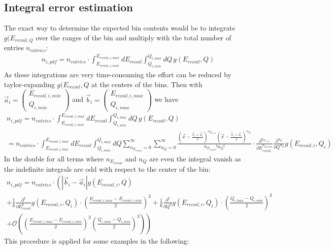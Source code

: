 \subsection{Integral error estimation}
The exact way to determine the expected bin contents would be to integrate $g(E_{recoil,Q}$ over the ranges of the bin and multiply with the total number of entries $n_{entries}$:
\begin{gather}
n_{i,pdf} = n_{entries} \cdot \int_{E_{recoil,i,min}}^{E_{recoil,i,max}} dE_{recoil} \int_{Q_{i,min}}^{Q_{i,max}} dQ \, g(E_{recoil},Q)
\end{gather}
As these integrations are very time-consuming the effort can be reduced by taylor-expanding $g(E_{recoil},Q$ at the centers of the bins.
Then with $\vec{a}_i = \begin{pmatrix} E_{recoil,i,min} \\ Q_{i,min} \end{pmatrix}$ and $\vec{b}_i = \begin{pmatrix} E_{recoil,i,max} \\ Q_{i,max} \end{pmatrix}$ we have
\begin{gather}
n_{i,pdf} = n_{entries} \cdot \int_{E_{recoil,i,min}}^{E_{recoil,i,max}} dE_{recoil} \int_{Q_{i,min}}^{Q_{i,max}} dQ \, g(E_{recoil},Q) \\
 = n_{entries} \cdot \int_{E_{recoil,i,min}}^{E_{recoil,i,max}} dE_{recoil} \int_{Q_{i,min}}^{Q_{i,max}} dQ \sum_{n_{E_{recoil}} = 0}^\infty \sum_{n_{Q} = 0}^\infty
\frac{\left( \vec{x} - \frac{\vec{b}_i + \vec{a}_i}{2} \right)^{n_{E_{recoil}}} \left( \vec{x} - \frac{\vec{b}_i + \vec{a}_i}{2} \right)^{n_{Q}}}{n_{E_{recoil}}! n_Q!}
\cdot \frac{\partial^{n_{E_{recoil}}}}{\partial E_{recoil} ^{n_{E_recoil}}} \frac{\partial^{n_{Q}}}{\partial Q^{n_{Q}}} g(E_{recoil,i},Q_i)
\end{gather}
In the double for all terms where $n_{E_{recoil}}$ and $n_{Q}$ are even the integral vanish as the indefinite integrals are odd with respect to the center of the bin:
\begin{gather}
n_{i,pdf} = n_{entries} \cdot \left(  \left| \vec{b}_i - \vec{a}_i \right| g(E_{recoil,i},Q) \right. \\
+ \frac{1}{6} \frac{\partial^2}{\partial E_{recoil}^2} g(E_{recoil,i},Q_i) \cdot \left( \frac{E_{recoil,i,max} - E_{recoil,i,min}}{2} \right)^3 
+ \frac{1}{6} \frac{\partial^2}{\partial Q^2} g(E_{recoil,i},Q_i) \cdot \left( \frac{Q_{i,max} - Q_{i,min}}{2} \right)^3  \\
+ \left. \mathcal O \left( \left( \frac{E_{recoil,i,max} - E_{recoil,i,min}}{2} \right)^3 \left( \frac{Q_{i,max} - Q_{i,min}}{2} \right)^3 \right) \right)
\end{gather}
This procedure is applied for some examples in the following: \\[0.5cm]
